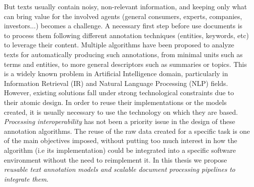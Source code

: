 But texts usually contain noisy, non-relevant information, and keeping only what can bring value for the involved agents (general consumers, experts, companies, investors...) becomes a challenge. A necessary first step before use documents is to process them following different annotation techniques (entities, keywords, etc) to leverage their content. Multiple algorithms have been proposed to analyze texts for automatically producing such annotations, from minimal units such as terms and entities, to more general descriptors such as summaries or topics. This is a widely known problem in Artificial Intelligence domain, particularly in Information Retrieval (IR) and Natural Language Processing (NLP) fields. However, existing solutions fall under strong technological constraints due to their atomic design. In order to reuse their implementations or the models created, it is usually necessary to use the technology on which they are based. \textit{Processing interoperability} has not been a priority issue in the design of these annotation algorithms. The reuse of the raw data created for a specific task is one of the main objectives imposed, without putting too much interest in how the algorithm (i.e its implementation) could be integrated into a specific software environment without the need to reimplement it. In this thesis we propose \textit{reusable text annotation models and scalable document processing pipelines to integrate them}. 



